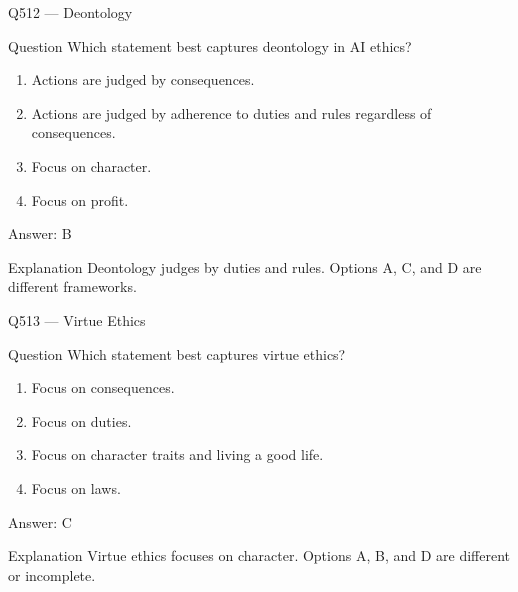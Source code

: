 \documentclass[aspectratio=169,8pt]{beamer}
\begin{document}
	\begin{frame}{Q512 --- Deontology}
		\begin{block}{Question}
			Which statement best captures deontology in AI ethics?
			\begin{enumerate}
				\item Actions are judged by consequences.
				\item Actions are judged by adherence to duties and rules regardless of consequences.
				\item Focus on character.
				\item Focus on profit.
			\end{enumerate}
		\end{block}
		\begin{exampleblock}{Answer: B}\end{exampleblock}
		\begin{block}{Explanation}
			Deontology judges by duties and rules. Options A, C, and D are different frameworks.
		\end{block}
	\end{frame}
	
	\begin{frame}{Q513 --- Virtue Ethics}
		\begin{block}{Question}
			Which statement best captures virtue ethics?
			\begin{enumerate}
				\item Focus on consequences.
				\item Focus on duties.
				\item Focus on character traits and living a good life.
				\item Focus on laws.
			\end{enumerate}
		\end{block}
		\begin{exampleblock}{Answer: C}\end{exampleblock}
		\begin{block}{Explanation}
			Virtue ethics focuses on character. Options A, B, and D are different or incomplete.
		\end{block}
	\end{frame}
	
\end{document}
